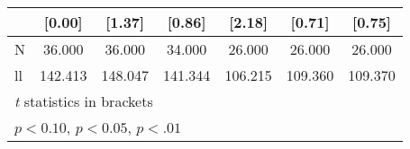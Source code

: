 {\begin{tabular}{l*{6}{c}}
                    &      [0.00]        &      [1.37]        &      [0.86]        &      [2.18]        &      [0.71]        &      [0.75]        \\
\hline
N                   &      36.000        &      36.000        &      34.000        &      26.000        &      26.000        &      26.000        \\
ll                  &     142.413        &     148.047        &     141.344        &     106.215        &     109.360        &     109.370        \\
\hline\hline
\multicolumn{7}{l}{\footnotesize \textit{t} statistics in brackets}\\
\multicolumn{7}{l}{\footnotesize \sym{+} \(p<0.10\), \sym{*} \(p<0.05\), \sym{**} \(p<.01\)}\\
\end{tabular}
}
